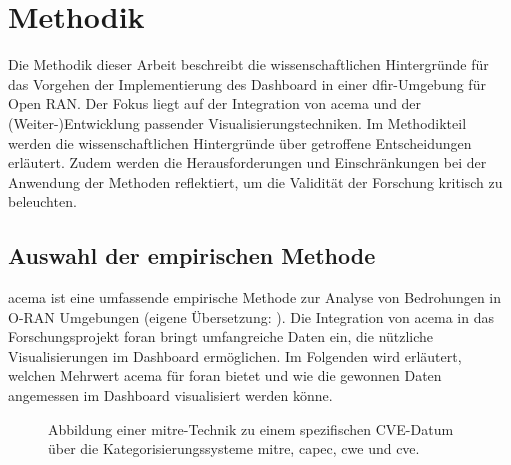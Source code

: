 \chapter{Methodik}
\label{chap:methodik}
Die Methodik dieser Arbeit beschreibt die wissenschaftlichen Hintergründe für das Vorgehen der Implementierung des Dashboard in einer \gls{dfir}-Umgebung für Open RAN. Der Fokus liegt auf der Integration von \gls{acema} und der (Weiter-)Entwicklung passender Visualisierungstechniken. Im Methodikteil werden die wissenschaftlichen Hintergründe über getroffene Entscheidungen erläutert. Zudem werden die Herausforderungen und Einschränkungen bei der Anwendung der Methoden reflektiert, um die Validität der Forschung kritisch zu beleuchten.
\section{Auswahl der empirischen Methode}
\label{sec:auswahlDerEmpirischenMethode}
\gls{acema} ist \glqq eine umfassende empirische Methode zur Analyse von Bedrohungen in O-RAN Umgebungen \grqq (eigene Übersetzung: \autocite{klementSecuring6GTransition2024}). Die Integration von \gls{acema} in das Forschungsprojekt \gls{foran} bringt umfangreiche Daten ein, die nützliche Visualisierungen im Dashboard ermöglichen. Im Folgenden wird erläutert, welchen Mehrwert \gls{acema} für \gls{foran} bietet und wie die gewonnen Daten angemessen im Dashboard visualisiert werden könne.
\par 

%
\begin{figure}[H]
    \centering
    \caption{Abbildung einer \gls{mitre}-Technik zu einem spezifischen CVE-Datum über die Kategorisierungssysteme \gls{mitre}, \gls{capec}, \gls{cwe} und \gls{cve}.}
    \label{fig:mitre_mapping}
\end{figure}

